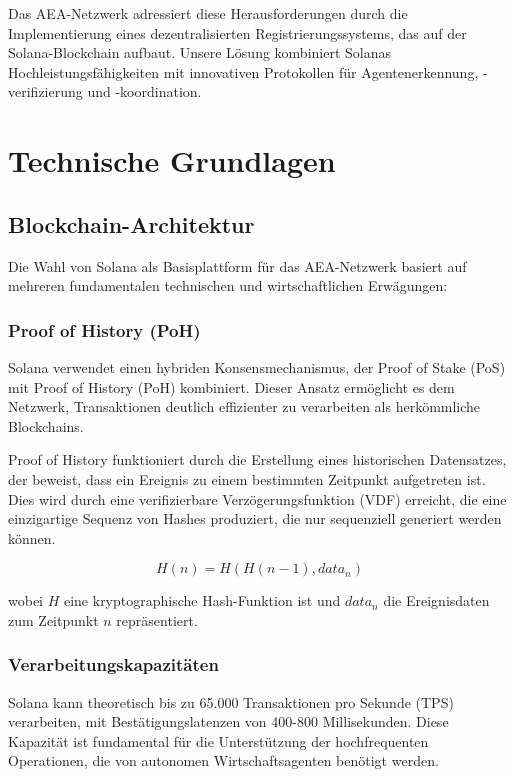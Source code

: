 \documentclass[12pt,a4paper]{article}
\begin{document}
Das AEA-Netzwerk adressiert diese Herausforderungen durch die Implementierung eines dezentralisierten Registrierungssystems, das auf der Solana-Blockchain aufbaut. Unsere Lösung kombiniert Solanas Hochleistungsfähigkeiten mit innovativen Protokollen für Agentenerkennung, -verifizierung und -koordination.

\section{Technische Grundlagen}

\subsection{Blockchain-Architektur}

Die Wahl von Solana als Basisplattform für das AEA-Netzwerk basiert auf mehreren fundamentalen technischen und wirtschaftlichen Erwägungen:

\subsubsection{Proof of History (PoH)}

Solana verwendet einen hybriden Konsensmechanismus, der Proof of Stake (PoS) mit Proof of History (PoH) kombiniert. Dieser Ansatz ermöglicht es dem Netzwerk, Transaktionen deutlich effizienter zu verarbeiten als herkömmliche Blockchains.

Proof of History funktioniert durch die Erstellung eines historischen Datensatzes, der beweist, dass ein Ereignis zu einem bestimmten Zeitpunkt aufgetreten ist. Dies wird durch eine verifizierbare Verzögerungsfunktion (VDF) erreicht, die eine einzigartige Sequenz von Hashes produziert, die nur sequenziell generiert werden können.

\begin{equation}
H(n) = H(H(n-1), data_n)
\end{equation}

wobei $H$ eine kryptographische Hash-Funktion ist und $data_n$ die Ereignisdaten zum Zeitpunkt $n$ repräsentiert.

\subsubsection{Verarbeitungskapazitäten}

Solana kann theoretisch bis zu 65.000 Transaktionen pro Sekunde (TPS) verarbeiten, mit Bestätigungslatenzen von 400-800 Millisekunden. Diese Kapazität ist fundamental für die Unterstützung der hochfrequenten Operationen, die von autonomen Wirtschaftsagenten benötigt werden.
\end{document}

